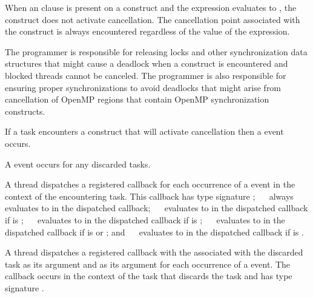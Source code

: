When an  clause is present on a  construct and the 
 expression evaluates to , the  construct 
does not activate cancellation. The cancellation point associated with the 
 construct is always encountered regardless of the value of
the  expression.

\begin{note}
The programmer is responsible for releasing locks and
other synchronization data structures that might cause a deadlock when
a  construct is encountered and blocked threads cannot be
canceled. The programmer is also responsible for ensuring proper
synchronizations to avoid deadlocks that might arise from cancellation
of OpenMP regions that contain OpenMP synchronization constructs.
\end{note}

\events

If a task encounters a  construct that will
  activate cancellation then a  event occurs.

A  event occurs for any discarded tasks.

\tools

A thread dispatches a registered  callback 
for each occurrence of a  event in the context of the encountering 
task. This callback has type signature ; 
\code{(}~\code{&}~ always evaluates 
to  in the dispatched callback; 
\code{(}~\code{&}~ evaluates to 
 in the dispatched callback if  is
; 
\code{(}~\code{&}~ evaluates to 
 in the dispatched callback if  is
; 
\code{(}~\code{&}~ evaluates to 
 in the dispatched callback if  is
 or ; and 
\code{(}~\code{&}~ evaluates to 
 in the dispatched callback if  is
. 

A thread dispatches a registered  callback with
the  associated with the discarded task as its  
argument and  as its  argument
for each occurrence of a  event. The callback occurs in 
the context of the task that discards the task and has type signature 
.

